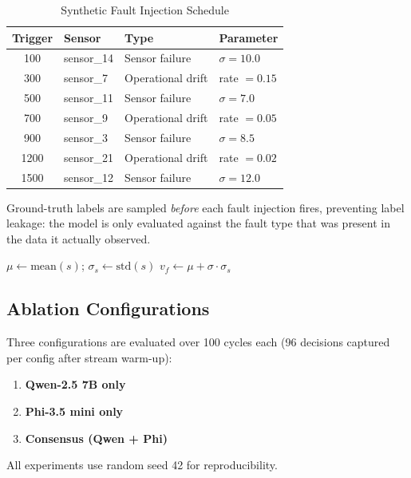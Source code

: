 \documentclass[conference, 10pt]{IEEEtran}
\begin{document}
\begin{table}[ht]
\centering
\caption{Synthetic Fault Injection Schedule}
\label{tab:fault_schedule}
\begin{tabular}{@{}clll@{}}
\toprule
\textbf{Trigger} & \textbf{Sensor} & \textbf{Type} & \textbf{Parameter} \\ \midrule
100  & sensor\_14 & Sensor failure    & $\sigma = 10.0$ \\
300  & sensor\_7  & Operational drift & rate $= 0.15$ \\
500  & sensor\_11 & Sensor failure    & $\sigma = 7.0$ \\
700  & sensor\_9  & Operational drift & rate $= 0.05$ \\
900  & sensor\_3  & Sensor failure    & $\sigma = 8.5$ \\
1200 & sensor\_21 & Operational drift & rate $= 0.02$ \\
1500 & sensor\_12 & Sensor failure    & $\sigma = 12.0$ \\ \bottomrule
\end{tabular}
\end{table}

Ground-truth labels are sampled \emph{before} each fault injection fires, preventing label leakage: the model is only evaluated against the fault type that was present in the data it actually observed.

\begin{algorithm}[H]
\SetAlgoLined
{}
 $\mu \leftarrow \text{mean}(s)$; $\sigma_s \leftarrow \text{std}(s)$\;
 $v_f \leftarrow \mu + \sigma \cdot \sigma_s$\;
 \caption{Stuck-At-Constant Fault Injection}
\end{algorithm}

\subsection{Ablation Configurations}
Three configurations are evaluated over 100 cycles each (96 decisions captured per config after stream warm-up):
\begin{enumerate}
    \item \textbf{Qwen-2.5 7B only}
    \item \textbf{Phi-3.5 mini only}
    \item \textbf{Consensus (Qwen + Phi)}
\end{enumerate}
All experiments use random seed 42 for reproducibility.
\end{document}
